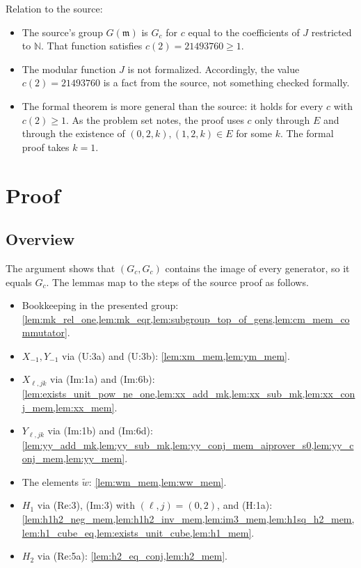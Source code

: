 \documentclass[11pt]{article}
\theoremstyle{definition}
\theoremstyle{remark}
\newcommand{\wt}{\widetilde{w}}
\begin{document}
Relation to the source:
\begin{itemize}
\item The source's group $G(\mathfrak m)$ is $G_c$ for $c$ equal to the coefficients of $J$ restricted to $\mathbb N$. That function satisfies $c(2)=21493760\ge1$.
\item The modular function $J$ is not formalized. Accordingly, the value $c(2)=21493760$ is a fact from the source, not something checked formally.
\item The formal theorem is more general than the source: it holds for every $c$ with $c(2)\ge 1$. As the problem set notes, the proof uses $c$ only through $E$ and through the existence of $(0,2,k),(1,2,k)\in E$ for some $k$. The formal proof takes $k=1$.
\end{itemize}

\section{Proof}

\subsection{Overview}

The argument shows that $(G_c,G_c)$ contains the image of every generator, so it equals $G_c$. The lemmas map to the steps of the source proof as follows.
\begin{itemize}
\item Bookkeeping in the presented group: \cref{lem:mk_rel_one,lem:mk_eqr,lem:subgroup_top_of_gens,lem:cm_mem_commutator}.
\item $X_{-1},Y_{-1}$ via (U:3a) and (U:3b): \cref{lem:xm_mem,lem:ym_mem}.
\item $X_{\ell,jk}$ via (Im:1a) and (Im:6b): \cref{lem:exists_unit_pow_ne_one,lem:xx_add_mk,lem:xx_sub_mk,lem:xx_conj_mem,lem:xx_mem}.
\item $Y_{\ell,jk}$ via (Im:1b) and (Im:6d): \cref{lem:yy_add_mk,lem:yy_sub_mk,lem:yy_conj_mem_aiprover_s0,lem:yy_conj_mem,lem:yy_mem}.
\item The elements $\wt$: \cref{lem:wm_mem,lem:ww_mem}.
\item $H_1$ via (Re:3), (Im:3) with $(\ell,j)=(0,2)$, and (H:1a): \cref{lem:h1h2_neg_mem,lem:h1h2_inv_mem,lem:im3_mem,lem:h1sq_h2_mem,lem:h1_cube_eq,lem:exists_unit_cube,lem:h1_mem}.
\item $H_2$ via (Re:5a): \cref{lem:h2_eq_conj,lem:h2_mem}.
\end{itemize}
\end{document}
